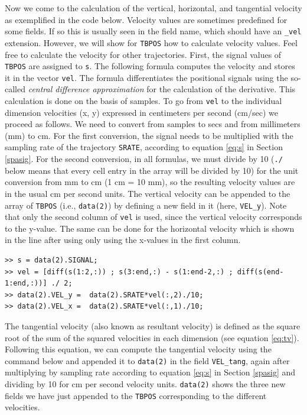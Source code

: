\documentclass[a4paper, 12pt]{article}
\begin{document}
Now we come to the calculation of the vertical, horizontal, and tangential velocity as exemplified in the code below. Velocity values are sometimes predefined for some fields. If so this is usually seen in the field name, which should have an \texttt{\_vel} extension. However, we will show for \texttt{TBPOS} how to calculate velocity values. Feel free to calculate the velocity for other trajectories. First, the signal values of \texttt{TBPOS} are assigned to \texttt{s}. The following formula computes the velocity and stores it in the vector \texttt{vel}. The formula differentiates the positional signals using the so-called \textit{central difference approximation} for the calculation of the derivative.  This calculation is done on the basis of samples. To go from \texttt{vel} to the individual dimension velocities (x, y) expressed in centimeters per second (cm/sec)  we proceed as follows. We need to convert from samples to secs and from millimeters (mm) to cm. For the first conversion, the signal needs to be multiplied with the sampling rate of the trajectory \texttt{SRATE}, according to equation \eqref{eq:s} in Section \ref{spasig}. For the second conversion, in all formulas, we must divide by 10 (\texttt{./} below means that every cell entry in the array will be divided by 10) for the unit conversion from mm to cm (1 cm = 10 mm), so the resulting velocity values are in the usual cm per second units. The vertical velocity can be appended to the array of \texttt{TBPOS} (i.e., \texttt{data(2)}) by defining a new field in it (here, \texttt{VEL\_y}). Note that only the second column of \texttt{vel} is used, since the vertical velocity corresponds to the y-value. The same can be done for the horizontal velocity which is shown in the line after using only using the x-values in the first column. 

\begin{verbatim}
>> s = data(2).SIGNAL;
>> vel = [diff(s(1:2,:)) ; s(3:end,:) - s(1:end-2,:) ; diff(s(end-1:end,:))] ./ 2;
>> data(2).VEL_y =  data(2).SRATE*vel(:,2)./10; 
>> data(2).VEL_x =  data(2).SRATE*vel(:,1)./10;
\end{verbatim}

The tangential velocity (also known as resultant velocity) is defined as the square root of the sum of the squared velocities in each dimension (see equation \eqref{eq:tv}). Following this equation, we can compute the tangential velocity using the command below and appended it to \texttt{data(2)} in the field \texttt{VEL\_tang}, again after multiplying by sampling rate according to equation \eqref{eq:s} in Section \ref{spasig} and dividing by 10 for cm per second velocity units. \texttt{data(2)} shows the three new fields we have just appended to the \texttt{TBPOS} corresponding to the different velocities.
\end{document}
